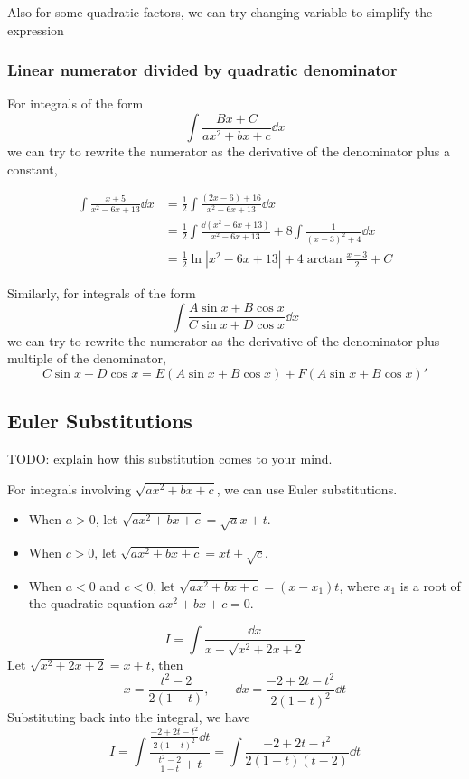 \documentclass{overview}
\begin{document}
Also for some quadratic factors, we can try changing variable to simplify the expression

\subsubsection{Linear numerator divided by quadratic denominator}
For integrals of the form
\[
	\int \frac{B x + C}{ax^2 + b x + c} \dd x
\]
we can try to rewrite the numerator as the derivative of the denominator plus a constant,
\begin{example}
	\[
		\begin{aligned}
		\int \frac{x+5}{x^2 - 6x + 13} \dd x
		&= \frac{1}{2}\int \frac{(2x - 6) + 16}{x^2 - 6x + 13} \dd x \\
		&= \frac{1}{2} \int \frac{\dd (x^2 - 6x + 13)}{x^2 - 6x + 13}
		+ 8 \int \frac{1}{(x-3)^2 + 4} \dd x \\
		&= \frac{1}{2} \ln|x^2 - 6x + 13| + 4 \arctan \frac{x-3}{2} + C
		\end{aligned}
	\]
	
\end{example}

Similarly, for integrals of the form
\[
	\int \frac{A\sin x + B \cos x}{C \sin x + D \cos x} \dd x
\] 
we can try to rewrite the numerator as the derivative of the denominator plus 
multiple of the denominator,
\[
C\sin x + D \cos x = E(A \sin x + B \cos x) + F(A \sin x + B \cos x)'
\] 
\subsection{Euler Substitutions}

TODO: explain how this substitution comes to your mind.

For integrals involving $\sqrt{a x^2 + b x + c}$, we can use Euler substitutions.
\begin{itemize}
	\item When $a > 0$, let $\sqrt{a x^2 + b x + c} = \sqrt{a} x + t$.
	\item When $c > 0$, let $\sqrt{a x^2 + b x + c} = x t + \sqrt{c}$.
	\item When $a < 0$ and $c < 0$, let $\sqrt{a x^2 + b x + c} = (x - x_1) t$,
	where $x_1$ is a root of the quadratic equation $a x^2 + b x + c = 0$.
\end{itemize}
\begin{example}
	\[
		I=\int \frac{\dd x}{x+\sqrt{x^2+ 2x + 2}}
	\]
	Let $\sqrt{x^2 + 2x + 2} = x + t$, then
	\[
		x = \frac{t^2 - 2}{2(1-t)}, \quad
		\quad \dd x = \frac{-2+2t-t^2}{2 (1-t)^2} \dd t
	\] 
	Substituting back into the integral, we have
	\[
		I = \int \frac{\frac{-2+2t-t^2}{2 (1-t)^2} \dd t}{\frac{t^2 - 2}{1-t} + t}
		= \int \frac{-2+2t - t^2}{2(1-t)(t-2)} \dd t
	\]
\end{example}
\end{document}
